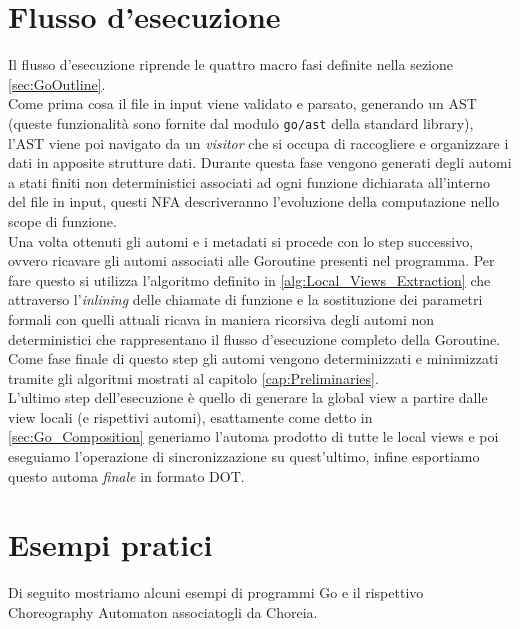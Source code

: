 \section{Flusso d'esecuzione}
Il flusso d'esecuzione riprende le quattro macro fasi definite nella sezione \ref{sec:GoOutline}.\bigskip\\
Come prima cosa il file in input viene validato e parsato, generando un AST (queste funzionalità sono fornite dal modulo \texttt{go/ast} della standard library), l'AST viene poi navigato da un \emph{visitor} che si occupa di raccogliere e organizzare i dati in apposite strutture dati. Durante questa fase vengono generati degli automi a stati finiti non deterministici associati ad ogni funzione dichiarata all'interno del file in input, questi NFA descriveranno l'evoluzione della computazione nello scope di funzione.\bigskip\\
Una volta ottenuti gli automi e i metadati si procede con lo step successivo, ovvero ricavare gli automi associati alle Goroutine presenti nel programma. Per fare questo si utilizza l'algoritmo definito in \ref{alg:Local_Views_Extraction} che attraverso l'\emph{inlining} delle chiamate di funzione e la sostituzione dei parametri formali con quelli attuali ricava in maniera ricorsiva degli automi non deterministici che rappresentano il flusso d'esecuzione completo della Goroutine. Come fase finale di questo step gli automi vengono determinizzati e minimizzati tramite gli algoritmi mostrati al capitolo \ref{cap:Preliminaries}.\bigskip\\
L'ultimo step dell'esecuzione è quello di generare la global view a partire dalle view locali (e rispettivi automi), esattamente come detto in \ref{sec:Go_Composition} generiamo l'automa prodotto di tutte le local views e poi eseguiamo l'operazione di sincronizzazione su quest'ultimo, infine esportiamo questo automa \emph{finale} in formato DOT.

\section{Esempi pratici}
Di seguito mostriamo alcuni esempi di programmi Go e il rispettivo Choreography Automaton associatogli da Choreia. %


